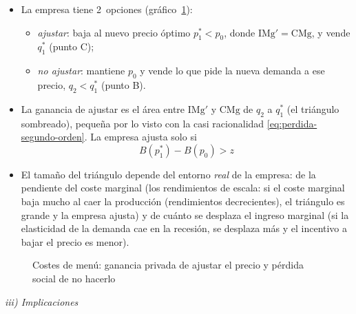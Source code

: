 \documentclass[11pt]{article}
\begin{document}
\begin{itemize}
\item La empresa tiene 2~opciones (gráfico~\ref{fig:costes-menu}):
  \begin{itemize}
  \item \emph{ajustar}: baja al nuevo precio óptimo $p^*_1<p_0$, donde $\mathrm{IMg}'=\mathrm{CMg}$, y vende $q^*_1$ (punto C);
  \item \emph{no ajustar}: mantiene $p_0$ y vende lo que pide la nueva demanda a ese precio, $q_2<q^*_1$ (punto B).
  \end{itemize}
\item La ganancia de ajustar es el área entre $\mathrm{IMg}'$ y $\mathrm{CMg}$ de $q_2$ a $q^*_1$ (el triángulo sombreado), pequeña por lo visto con la casi racionalidad \eqref{eq:perdida-segundo-orden}. La empresa ajusta solo si
  \begin{equation}
  B(p^*_1)-B(p_0)>z \label{eq:costes-menu}
  \end{equation}
\item El tamaño del triángulo depende del entorno \emph{real} de la empresa: de la pendiente del coste marginal (los rendimientos de escala: si el coste marginal baja mucho al caer la producción (rendimientos decrecientes), el triángulo es grande y la empresa ajusta) y de cuánto se desplaza el ingreso marginal (si la elasticidad de la demanda cae en la recesión, se desplaza más y el incentivo a bajar el precio es menor).
\end{itemize}

\begin{figure}[H]
\centering
\caption{Costes de menú: ganancia privada de ajustar el precio y pérdida social de no hacerlo}\label{fig:costes-menu}
\end{figure}

\hspace*{3.6em}\emph{iii) Implicaciones}
\end{document}
